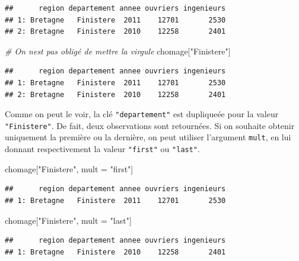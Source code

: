 \documentclass[
  11pt,
]{book}
\newenvironment{Shaded}{\begin{snugshade}}{\end{snugshade}}
\newcommand{\CommentTok}[1]{\textcolor[rgb]{0.56,0.35,0.01}{\textit{#1}}}
\newcommand{\NormalTok}[1]{#1}
\newcommand{\StringTok}[1]{\textcolor[rgb]{0.31,0.60,0.02}{#1}}
\numberwithin{equation}{section}
\numberwithin{countremarque}{section}
\begin{document}
\begin{lstlisting}
##      region departement annee ouvriers ingenieurs
## 1: Bretagne   Finistere  2011    12701       2530
## 2: Bretagne   Finistere  2010    12258       2401
\end{lstlisting}

\begin{Shaded}
\begin{Highlighting}[]
\CommentTok{\# On n\textquotesingle{}est pas obligé de mettre la virgule}
\NormalTok{chomage[}\StringTok{"Finistere"}\NormalTok{]}
\end{Highlighting}
\end{Shaded}

\begin{lstlisting}
##      region departement annee ouvriers ingenieurs
## 1: Bretagne   Finistere  2011    12701       2530
## 2: Bretagne   Finistere  2010    12258       2401
\end{lstlisting}

Comme on peut le voir, la clé \texttt{"departement"} est dupliqueée pour la valeur \texttt{"Finistere"}. De fait, deux observations sont retournées. Si on souhaite obtenir uniquement la première ou la dernière, on peut utiliser l'argument \texttt{mult}, en lui donnant respectivement la valeur \texttt{"first"} ou \texttt{"last"}.

\begin{Shaded}
\begin{Highlighting}[]
\NormalTok{chomage[}\StringTok{"Finistere"}\NormalTok{, mult =}\StringTok{ "first"}\NormalTok{]}
\end{Highlighting}
\end{Shaded}

\begin{lstlisting}
##      region departement annee ouvriers ingenieurs
## 1: Bretagne   Finistere  2011    12701       2530
\end{lstlisting}

\begin{Shaded}
\begin{Highlighting}[]
\NormalTok{chomage[}\StringTok{"Finistere"}\NormalTok{, mult =}\StringTok{ "last"}\NormalTok{]}
\end{Highlighting}
\end{Shaded}

\begin{lstlisting}
##      region departement annee ouvriers ingenieurs
## 1: Bretagne   Finistere  2010    12258       2401
\end{lstlisting}
\end{document}
